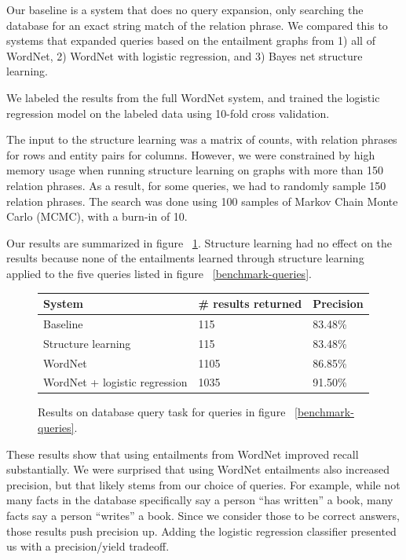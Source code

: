 \documentclass{article}
\begin{document}
Our baseline is a system that does no query expansion, only searching the database for an exact string match of the relation phrase. We compared this to systems that expanded queries based on the entailment graphs from 1) all of WordNet, 2) WordNet with logistic regression, and 3) Bayes net structure learning.

We labeled the results from the full WordNet system, and trained the logistic regression model on the labeled data using 10-fold cross validation.

The input to the structure learning was a matrix of counts, with relation phrases for rows and entity pairs for columns. However, we were constrained by high memory usage when running structure learning on graphs with more than 150 relation phrases. As a result, for some queries, we had to randomly sample 150 relation phrases. The search was done using 100 samples of Markov Chain Monte Carlo (MCMC), with a burn-in of 10.

Our results are summarized in figure ~\ref{results}. Structure learning had no effect on the results because none of the entailments learned through structure learning applied to the five queries listed in figure ~\ref{benchmark-queries}.

\begin{figure}[h]
  \begin{center}
    \begin{tabular}{ | l | l | l | }
      \hline
      System & \# results returned & Precision\\
      \hline
      Baseline & 115 & 83.48\%\\
      Structure learning & 115 & 83.48\%\\
      WordNet & 1105 & 86.85\% \\
      WordNet + logistic regression & 1035 & 91.50\%\\
      \hline
    \end{tabular}
  \end{center}
  \caption{Results on database query task for queries in figure ~\ref{benchmark-queries}.}\label{results}
\end{figure}

These results show that using entailments from WordNet improved recall substantially. We were surprised that using WordNet entailments also increased precision, but that likely stems from our choice of queries. For example, while not many facts in the database specifically say a person ``has written'' a book, many facts say a person ``writes'' a book. Since we consider those to be correct answers, those results push precision up. Adding the logistic regression classifier presented us with a precision/yield tradeoff.
\end{document}
